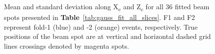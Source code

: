 \begin{figure}
\centering
{}
\caption{Mean and standard deviation along X\textsubscript{c} and Z\textsubscript{c} for all 36 fitted beam spots presented in \textbf{Table}~\ref{tab:gauss_fit_all_slices}. F1 and F2 represent fold-1 (blue) and -2 (orange) events, respectively. True positions of the beam spot are at vertical and horizontal dashed grid lines crossings denoted by magenta spots.}
\label{fig:18pts_gaussian_beam_spot}       %
\end{figure}


